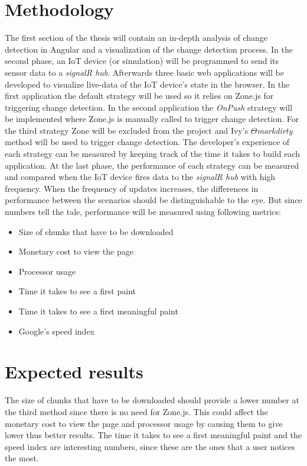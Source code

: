 \section{Methodology}
\label{sec:methodologie}
The first section of the thesis will contain an in-depth analysis of change detection in Angular and a visualization of the change detection process. 
In the second phase, an IoT device (or simulation) will be programmed to send its sensor data to a \emph{signalR hub}. 
Afterwards three basic web applications will be developed to visualize live-data of the IoT device's state in the browser. 
In the first application the default strategy will be used so it relies on Zone.js for triggering change detection. In the second application the \emph{OnPush} strategy will be implemented where Zone.js is manually called to trigger change detection. For the third strategy Zone will be excluded from the project and Ivy's \emph{\(\Theta\)markdirty} method will be used to trigger change detection.
The developer's experience of each strategy can be measured by keeping track of the time it takes to build each application.
At the last phase, the performance of each strategy can be measured and compared when the IoT device fires data to the \emph{signalR hub} with high frequency.  
When the frequency of updates increases, the differences in performance between the scenarios should be distinguishable to the eye. But since numbers tell the tale, performance will be measured using following metrics:
\begin{itemize}
    \item Size of chunks that have to be downloaded
    \item Monetary cost to view the page
    \item Processor usage
    \item Time it takes to see a first paint
    \item Time it takes to see a first meaningful paint
    \item Google's speed index
\end{itemize}
\autocite{Arsenault2017}

\section{Expected results}
\label{sec:verwachte_resultaten}
The size of chunks that have to be downloaded should provide a lower number at the third method since there is no need for Zone.js.
This could affect the monetary cost to view the page and processor usage by causing them to give lower thus better results. The time it takes to see a first meaningful paint and the speed index are interesting numbers, since these are the ones that a user notices the most.


